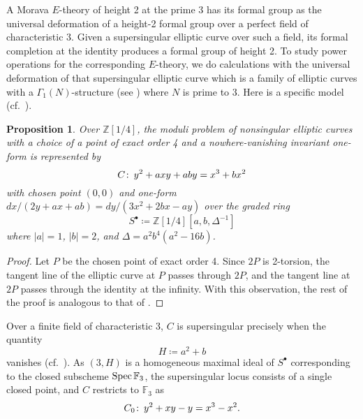 \documentclass{gtpart}
\newtheorem{prop}[thm]{Proposition}
\theoremstyle{definition}
\theoremstyle{remark}
\def\co{\colon\thinspace}
\newcommand{\mb}[1]{\mathbb{#1}}
\newcommand{\Spec}{{\rm Spec\thinspace}}
\newcommand{\BF}{{\mb F}}
\newcommand{\BZ}{{\mb Z}}
\newcommand{\G}{\Gamma}
\newcommand{\s}{S^\bullet}
\begin{document}
A Morava $E$-theory of height 2 at the prime 3 has its formal group as 
the universal deformation of a height-2 formal group over a perfect 
field of characteristic 3.  Given a supersingular elliptic curve over 
such a field, its formal completion at the identity produces a formal 
group of height 2.  To study power operations for the corresponding 
$E$-theory, we do calculations with the universal deformation of that 
supersingular elliptic curve which is a family of elliptic curves with a 
$\G_1(N)$-structure (see \cite[Section 3.2]{KM}) where $N$ is prime to 3.  
Here is a specific model (cf.~\cite[4(4.6a)]{husemoller}).  

\begin{prop}
\label{prop:C}
 Over $\BZ [1/4]$, the moduli problem of nonsingular elliptic curves 
 with a choice of a point of exact order 4 and a nowhere-vanishing 
 invariant one-form is represented by 
 \begin{equation}
 \label{Cxy}
  C \co y^2 + a x y + a b y = x^3 + b x^2 
 \end{equation}
 with chosen point $(0,0)$ and one-form 
 $dx / (2 y + a x + a b) = dy / (3 x^2 + 2 b x - a y)$ over the graded 
 ring 
 \[
  \s \coloneqq \BZ [1/4] [a, b, \Delta^{-1}] 
 \]
 where $|a| = 1$, $|b| = 2$, and $\Delta = a^2 b^4 (a^2 - 16 b)$.  
\end{prop}
\begin{proof}
 Let $P$ be the chosen point of exact order 4.  Since $2P$ is 2-torsion, 
 the tangent line of the elliptic curve at $P$ passes through $2P$, and 
 the tangent line at $2P$ passes through the identity at the infinity.  
 With this observation, the rest of the proof is analogous to that of 
 \cite[Proposition 3.2]{tmf3}.  
\end{proof}

Over a finite field of characteristic 3, $C$ is supersingular precisely 
when the quantity 
\begin{equation}
\label{H}
 H \coloneqq a^2 + b 
\end{equation}
vanishes (cf.~\cite[V.4.1a]{AEC}).  As $(3,H)$ is a homogeneous maximal 
ideal of $\s$ corresponding to the closed subscheme $\Spec \BF_3$, the 
supersingular locus consists of a single closed point, and $C$ restricts 
to $\BF_3$ as 
\[
 C_0 \co y^2 + x y - y = x^3 - x^2.  
\]
\end{document}
